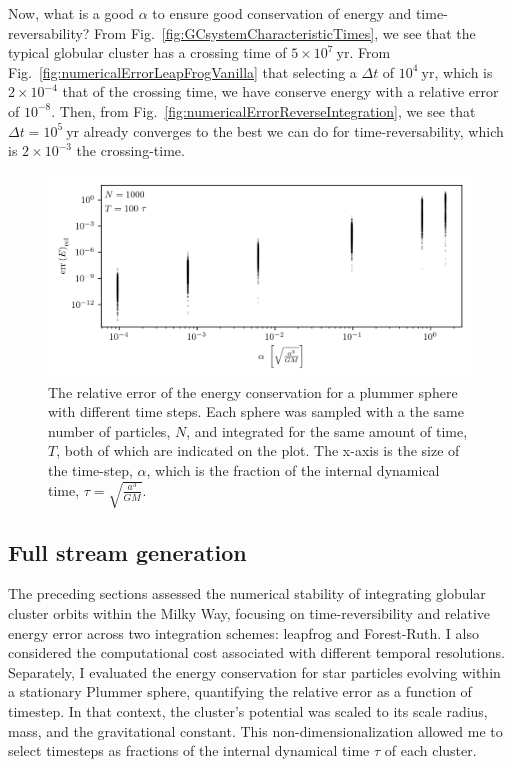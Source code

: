        
        Now, what is a good $\alpha$ to ensure good conservation of energy and time-reversability? From Fig.~\ref{fig:GCsystemCharacteristicTimes}, we see that the typical globular cluster has a crossing time of $5\times10^{7}~\mathrm{yr}$. From Fig.~\ref{fig:numericalErrorLeapFrogVanilla} that selecting a $\Delta t$ of $10^{4}~\mathrm{yr}$, which is $2\times 10^{-4}$ that of the crossing time, we have conserve energy with a relative error of $10^{-8}$. Then, from Fig.~\ref{fig:numericalErrorReverseIntegration}, we see that $\Delta t= 10^{5}~\mathrm{yr}$ already converges to the best we can do for time-reversability, which is $2\times10^{-3}$ the crossing-time. 


        \begin{figure}
            \centering
            \includegraphics[width=\linewidth]{images/numericalErrorStaticPlummerSphereEnergyError.png}
            \caption{The relative error of the energy conservation for a plummer sphere with different time steps. Each sphere was sampled with a the same number of particles, $N$, and integrated for the same amount of time, $T$, both of which are indicated on the plot. The x-axis is the size of the time-step, $\alpha$, which is the fraction of the internal dynamical time, $\tau = \sqrt{\frac{a^3}{GM}}$. }
            \label{fig:numericalErrorStaticPlummerSphereEnergyError}
        \end{figure}

    \subsection{Full stream generation}

        The preceding sections assessed the numerical stability of integrating globular cluster orbits within the Milky Way, focusing on time-reversibility and relative energy error across two integration schemes: leapfrog and Forest-Ruth. I also considered the computational cost associated with different temporal resolutions. Separately, I evaluated the energy conservation for star particles evolving within a stationary Plummer sphere, quantifying the relative error as a function of timestep. In that context, the cluster's potential was scaled to its scale radius, mass, and the gravitational constant. This non-dimensionalization allowed me to select timesteps as fractions of the internal dynamical time $\tau$ of each cluster. 



